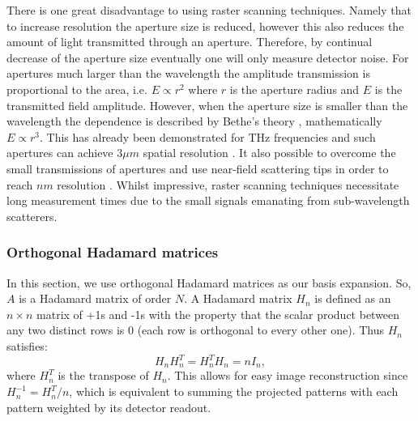 There is one great disadvantage to using raster scanning techniques. Namely that to increase resolution the aperture size is reduced, however this also reduces the amount of light transmitted through an aperture. Therefore, by continual decrease of the aperture size eventually one will only measure detector noise. For apertures much larger than the wavelength the amplitude transmission is proportional to the area, i.e. $E \propto r^2$ where $r$ is the aperture radius and $E$ is the transmitted field amplitude. However, when the aperture size is smaller than the wavelength the dependence is described by Bethe's theory \cite{Bethe1944}, mathematically  $E \propto r^3$. This has already been demonstrated for THz frequencies \cite{THz_apertures} and such apertures can achieve $3\mu m$ spatial resolution \cite{Image.3um_probes}. It also possible to overcome the small transmissions of apertures and use near-field scattering tips \cite{Image.Near-Fields} in order to reach $nm$ resolution \cite{Image.STM,Image.Nanoscope1}. Whilst impressive, raster scanning techniques necessitate long measurement times due to the small signals emanating from sub-wavelength scatterers.




\subsubsection{Orthogonal Hadamard matrices} \label{sec:had_mat}
In this section, we use orthogonal Hadamard matrices as our basis expansion. So, $A$ is a Hadamard matrix of order $N$. A Hadamard matrix $H_n$ is defined as an $n\times n$ matrix of +1s and -1s with the property that the scalar product between any two distinct rows is 0 (each row is orthogonal to every other one). Thus $H_n$ satisfies:
\begin{equation}
H_nH_n^T=H_n^TH_n=nI_n,
\label{eq:H_n}
\end{equation}
where $H_n^T$ is the transpose of $H_n$. This allows for easy image reconstruction since $H_n^{-1}=H_n^T/n$, which is equivalent to summing the projected patterns with each pattern weighted by its detector readout. 

